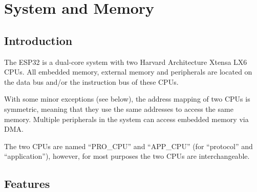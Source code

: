 \documentclass[main\_\_EN.tex]{subfiles}
\begin{document}
\hypertarget{sysmem}{}
\chapter{System and Memory}
\label{mod:sysmem}

\section{Introduction}

The ESP32 is a dual-core system with two Harvard Architecture Xtensa LX6 CPUs. All embedded memory, external memory and peripherals are located on the data bus and/or the instruction bus of these CPUs.

With some minor exceptions (see below), the address mapping of two CPUs is symmetric, meaning that they use the same addresses to access the same memory. Multiple peripherals in the system can access embedded memory via DMA.

The two CPUs are named “PRO\_CPU” and “APP\_CPU” (for “protocol” and “application”), however, for most purposes the two CPUs are interchangeable.

\section{Features}
\end{document}

